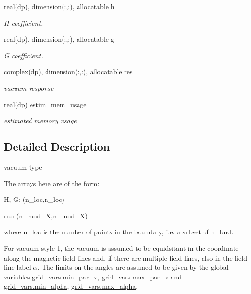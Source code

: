 \begin{DoxyCompactItemize}
real(dp), dimension(\+:,\+:), allocatable \hyperlink{structvac__vars_1_1vac__type_a409e9e1182fbfe4cdf9b882297a5faf9}{h}
\begin{DoxyCompactList}\small\item\em H coefficient. \end{DoxyCompactList}\item 
real(dp), dimension(\+:,\+:), allocatable \hyperlink{structvac__vars_1_1vac__type_abccce7d8c7e44b2bbc76104b2138ea5b}{g}
\begin{DoxyCompactList}\small\item\em G coefficient. \end{DoxyCompactList}\item 
complex(dp), dimension(\+:,\+:), allocatable \hyperlink{structvac__vars_1_1vac__type_ac7baffb7968c67d876d2c3f8a7c90a89}{res}
\begin{DoxyCompactList}\small\item\em vacuum response \end{DoxyCompactList}\item 
real(dp) \hyperlink{structvac__vars_1_1vac__type_ab01e7e74ce3f5c2a0e4bff7cd88d5c3f}{estim\+\_\+mem\+\_\+usage}
\begin{DoxyCompactList}\small\item\em estimated memory usage \end{DoxyCompactList}\end{DoxyCompactItemize}


\subsection{Detailed Description}
vacuum type 

The arrays here are of the form\+:
\begin{DoxyItemize}
\item {\ttfamily H}, {\ttfamily G\+:} {\ttfamily (n\+\_\+loc,n\+\_\+loc)}
\item {\ttfamily res\+:} {\ttfamily (n\+\_\+mod\+\_\+X,n\+\_\+mod\+\_\+X)}
\end{DoxyItemize}

where {\ttfamily n\+\_\+loc} is the number of points in the boundary, i.\+e. a subset of {\ttfamily n\+\_\+bnd}.

For vacuum style 1, the vacuum is assumed to be equidsitant in the coordinate along the magnetic field lines and, if there are multiple field lines, also in the field line label $\alpha$. The limits on the angles are assumed to be given by the global variables {\ttfamily \hyperlink{namespacegrid__vars_a689c08cf03bc54338878f85c6429b856}{grid\+\_\+vars.\+min\+\_\+par\+\_\+x}}, {\ttfamily \hyperlink{namespacegrid__vars_acaa1fd21d0c728ad8f24591c0d2a5801}{grid\+\_\+vars.\+max\+\_\+par\+\_\+x}} and {\ttfamily \hyperlink{namespacegrid__vars_ad6f74227054278479670c68d8950e0e2}{grid\+\_\+vars.\+min\+\_\+alpha}}, {\ttfamily \hyperlink{namespacegrid__vars_ad3cab5cd1037b6956ccf74cde4539298}{grid\+\_\+vars.\+max\+\_\+alpha}}.

